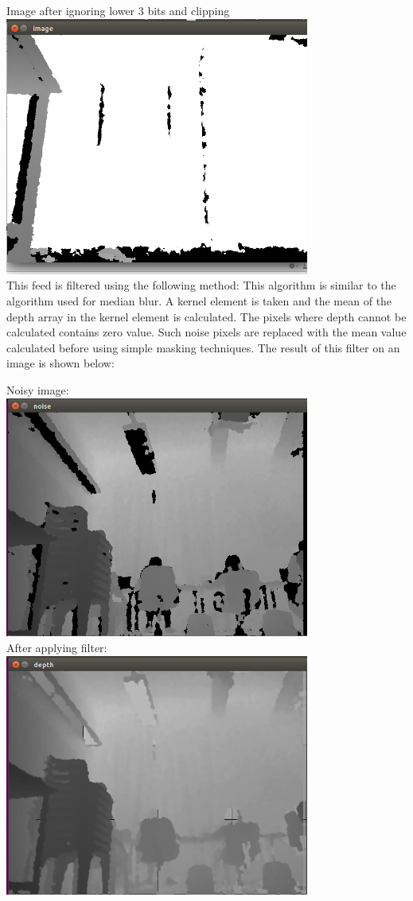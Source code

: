 \documentclass{report}
\begin{document}
Image after ignoring lower 3 bits and clipping \\
\includegraphics[width = 10cm]{d_3bit.png} \\

This feed is filtered using the following method:
This algorithm is similar to the algorithm used for median blur. A kernel element is taken and the mean of the depth array in the
kernel element is calculated. The pixels where depth cannot be calculated contains zero value. Such noise pixels are replaced
with the mean value calculated before using simple masking techniques. The result of this filter on an image is shown below:\\
\pagebreak

Noisy image: \\ 
\includegraphics[width = 10cm]{Noise.png} \\
After applying filter: \\
\includegraphics[width = 10cm]{Noiseless.png} \\
\end{document}
